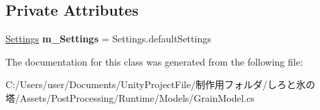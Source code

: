 \subsection*{Private Attributes}
\begin{DoxyCompactItemize}
\item 
\mbox{\label{class_unity_engine_1_1_post_processing_1_1_grain_model_a0a73646b0ac0ebf8bb63c17ae08eaaf7}} 
\hyperlink{struct_unity_engine_1_1_post_processing_1_1_grain_model_1_1_settings}{Settings} {\bfseries m\+\_\+\+Settings} = Settings.\+default\+Settings
\end{DoxyCompactItemize}


The documentation for this class was generated from the following file\+:\begin{DoxyCompactItemize}
\item 
C\+:/\+Users/user/\+Documents/\+Unity\+Project\+File/制作用フォルダ/しろと氷の塔/\+Assets/\+Post\+Processing/\+Runtime/\+Models/Grain\+Model.\+cs\end{DoxyCompactItemize}

